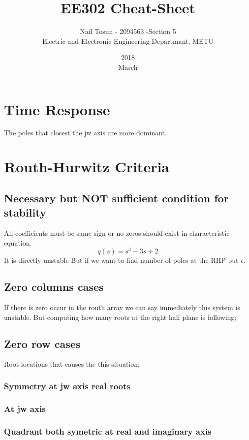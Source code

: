 \documentclass[11pt]{article}
\title{EE302 Cheat-Sheet}
\date{2018\\ March}
\author{Nail Tosun - 2094563 -Section 5\\ Electric and Electronic Engineering Departmant, METU}
\begin{document}
\maketitle
\section*{Time Response}
The poles that closest the jw axis are more dominant.
\section*{Routh-Hurwitz Criteria}
\subsection*{Necessary but NOT sufficient condition for stability}
All coefficients must be same sign or no zeros should exist in characteristic equation.
\[q(s)=s^3-3s+2\]
It is directly unstable But if we want to find number of poles at the RHP put $\epsilon$.
\subsection*{Zero columns cases}
If there is zero occur in the routh array we can say immediately this system is  unstable. But computing how many roots at the right half plane is following;
\subsection*{Zero row cases}
Root locations that causes the this situation;
\subsubsection*{Symmetry at jw axis real roots}
\subsubsection*{At jw axis}
\subsubsection*{Quadrant both symetric at real and imaginary axis}
\end{document}

